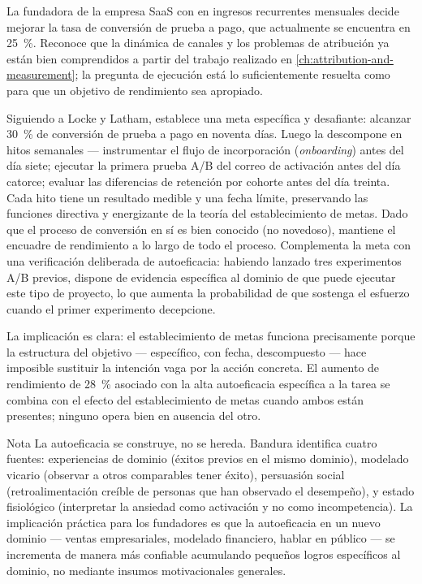\begin{example}
La fundadora de la empresa SaaS con  en ingresos recurrentes mensuales decide
mejorar la tasa de conversión de prueba a pago, que actualmente se encuentra en
\qty{25}{\percent}. Reconoce que la dinámica de canales y los problemas de atribución ya están
bien comprendidos a partir del trabajo realizado en \cref{ch:attribution-and-measurement}; la
pregunta de ejecución está lo suficientemente resuelta como para que un objetivo de rendimiento
sea apropiado.

Siguiendo a Locke y Latham, establece una meta específica y desafiante: alcanzar
\qty{30}{\percent} de conversión de prueba a pago en noventa días. Luego la descompone en hitos
semanales --- instrumentar el flujo de incorporación (\emph{onboarding}) antes del día siete;
ejecutar la primera prueba A/B del correo de activación antes del día catorce; evaluar las
diferencias de retención por cohorte antes del día treinta. Cada hito tiene un resultado medible
y una fecha límite, preservando las funciones directiva y energizante de la teoría del
establecimiento de metas. Dado que el proceso de conversión en sí es bien conocido (no novedoso),
mantiene el encuadre de rendimiento a lo largo de todo el proceso. Complementa la meta con una
verificación deliberada de autoeficacia: habiendo lanzado tres experimentos A/B previos, dispone
de evidencia específica al dominio de que puede ejecutar este tipo de proyecto, lo que aumenta
la probabilidad de que sostenga el esfuerzo cuando el primer experimento decepcione.

La implicación es clara: el establecimiento de metas funciona precisamente porque la estructura
del objetivo --- específico, con fecha, descompuesto --- hace imposible sustituir la intención
vaga por la acción concreta. El aumento de rendimiento de \qty{28}{\percent} asociado con la alta
autoeficacia específica a la tarea se combina con el efecto del establecimiento de metas cuando
ambos están presentes; ninguno opera bien en ausencia del otro.
\end{example}

\begin{admonition}{Nota}
La autoeficacia se construye, no se hereda. Bandura identifica cuatro fuentes: experiencias de
dominio (éxitos previos en el mismo dominio), modelado vicario (observar a otros comparables
tener éxito), persuasión social (retroalimentación creíble de personas que han observado el
desempeño), y estado fisiológico (interpretar la ansiedad como activación y no como
incompetencia). La implicación práctica para los fundadores es que la autoeficacia en un nuevo
dominio --- ventas empresariales, modelado financiero, hablar en público --- se incrementa de
manera más confiable acumulando pequeños logros específicos al dominio, no mediante insumos
motivacionales generales.
\end{admonition}

